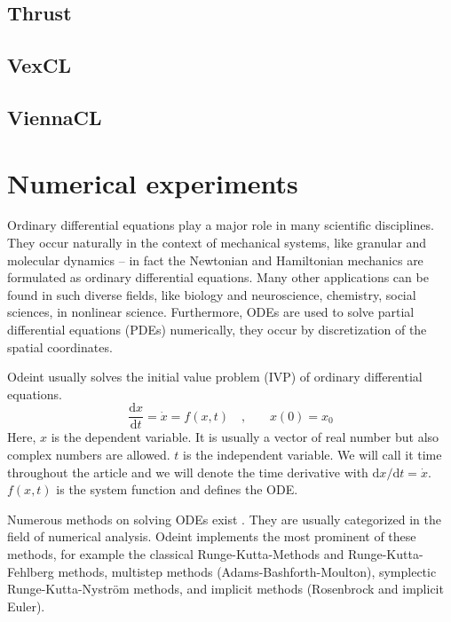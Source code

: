 \documentclass[1p]{elsarticle}
\newcommand {\de} {\mbox{d}}
\begin{document}
\subsection{Thrust}
\subsection{VexCL}
\subsection{ViennaCL}














\section{Numerical experiments}

Ordinary differential equations play a major role in many scientific
disciplines. They occur naturally in the context of mechanical
systems, like granular and molecular dynamics -- in fact the Newtonian
and Hamiltonian mechanics are formulated as ordinary differential
equations. Many other applications can be found in such diverse
fields, like biology and neuroscience, chemistry, social sciences, in
nonlinear science. Furthermore, ODEs are used to solve partial
differential equations (PDEs) numerically, they occur by discretization of
the spatial coordinates.

Odeint usually solves the initial value problem (IVP) of ordinary differential equations.
\begin{equation}
\frac{\de x}{\de t } = \dot{x} = f(x , t) \quad \text{,} \quad \quad x(0) = x_0
\end{equation}
Here, $x$ is the dependent variable. It is usually a vector of real
number but also complex numbers are allowed. $t$ is the independent
variable. We will call it time throughout the article and we will
denote the time derivative with $\de x / \de t = \dot{x}$. $f(x,t)$
is the system function and defines the ODE.

Numerous methods on solving ODEs exist
\cite{HairerSolvingODEI,HairerSolvingODEII,HairerGeometricNumericalIntegration2006}. They
are usually categorized in the field of numerical analysis. Odeint
implements the most prominent of these methods, for example the
classical Runge-Kutta-Methods and Runge-Kutta-Fehlberg methods,
multistep methods (Adams-Bashforth-Moulton), symplectic
Runge-Kutta-Nystr\"om methods, and implicit methods (Rosenbrock and
implicit Euler).
\end{document}

